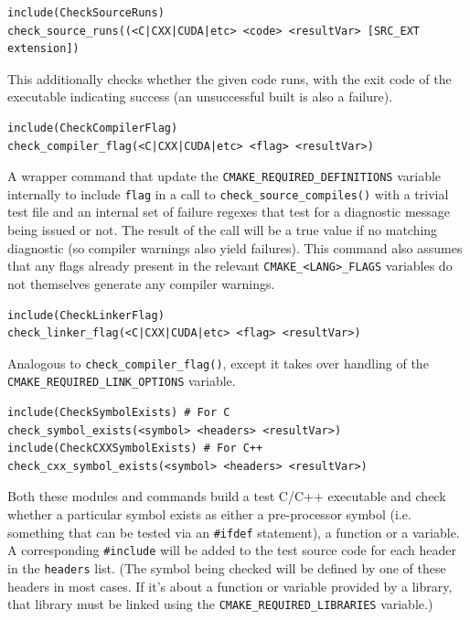 \documentclass[table, xcdraw]{article}%
\begin{document}
\begin{verbatim}
include(CheckSourceRuns)
check_source_runs((<C|CXX|CUDA|etc> <code> <resultVar> [SRC_EXT extension])
\end{verbatim}

This additionally checks whether the given code runs, with the exit code of the executable indicating success (an unsuccessful built is also a failure).

\begin{verbatim}
include(CheckCompilerFlag)
check_compiler_flag(<C|CXX|CUDA|etc> <flag> <resultVar>)
\end{verbatim}

A wrapper command that update the \texttt{CMAKE_REQUIRED_DEFINITIONS} variable internally to include \texttt{flag} in a call to \texttt{check_source_compiles()} with a trivial test file and an internal set of failure regexes that test for a diagnostic message being issued or not. The result of the call will be a true value if no matching diagnostic (so compiler warnings also yield failures). This command also assumes that any flags already present in the relevant \texttt{CMAKE_<LANG>_FLAGS} variables do not themselves generate any compiler warnings.

\begin{verbatim}
include(CheckLinkerFlag)
check_linker_flag(<C|CXX|CUDA|etc> <flag> <resultVar>)
\end{verbatim}

Analogous to \texttt{check_compiler_flag()}, except it takes over handling of the \texttt{CMAKE_REQUIRED_LINK_OPTIONS} variable.

\begin{verbatim}
include(CheckSymbolExists) # For C
check_symbol_exists(<symbol> <headers> <resultVar>)
include(CheckCXXSymbolExists) # For C++
check_cxx_symbol_exists(<symbol> <headers> <resultVar>)
\end{verbatim}

Both these modules and commands build a test C/C++ executable and check whether a particular symbol exists as either a pre-processor symbol (i.e. something that can be tested via an \texttt{#ifdef} statement), a function or a variable. A corresponding \texttt{#include} will be added to the test source code for each header in the \texttt{headers} list. (The symbol being checked will be defined by one of these headers in most cases. If it's about a function or variable provided by a library, that library must be linked using the \texttt{CMAKE_REQUIRED_LIBRARIES} variable.) 
\end{document}
